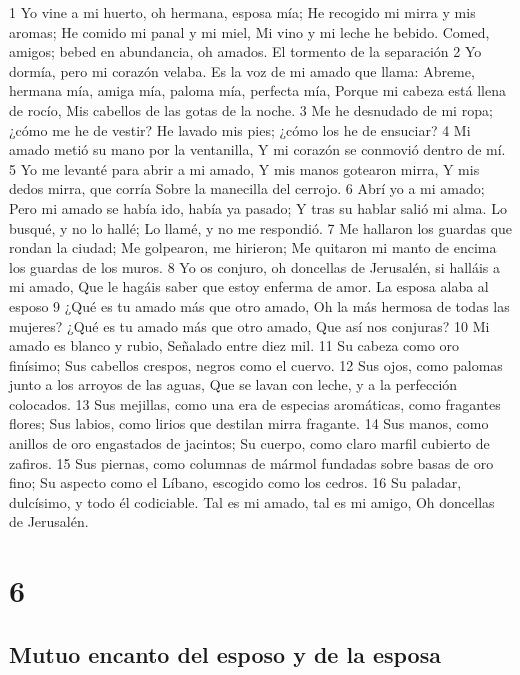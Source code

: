 1 Yo vine a mi huerto, oh hermana, esposa mía;
He recogido mi mirra y mis aromas;
He comido mi panal y mi miel,
Mi vino y mi leche he bebido.
Comed, amigos; bebed en abundancia, oh amados.
El tormento de la separación
2 Yo dormía, pero mi corazón velaba.
Es la voz de mi amado que llama:
Abreme, hermana mía, amiga mía, paloma mía, perfecta mía,
Porque mi cabeza está llena de rocío,
Mis cabellos de las gotas de la noche.
3 Me he desnudado de mi ropa; ¿cómo me he de vestir?
He lavado mis pies; ¿cómo los he de ensuciar?
4 Mi amado metió su mano por la ventanilla,
Y mi corazón se conmovió dentro de mí.
5 Yo me levanté para abrir a mi amado,
Y mis manos gotearon mirra,
Y mis dedos mirra, que corría
Sobre la manecilla del cerrojo.
6 Abrí yo a mi amado;
Pero mi amado se había ido, había ya pasado;
Y tras su hablar salió mi alma.
Lo busqué, y no lo hallé;
Lo llamé, y no me respondió.
7 Me hallaron los guardas que rondan la ciudad;
Me golpearon, me hirieron;
Me quitaron mi manto de encima los guardas de los muros.
8 Yo os conjuro, oh doncellas de Jerusalén, si halláis a mi amado,
Que le hagáis saber que estoy enferma de amor.
La esposa alaba al esposo
9 ¿Qué es tu amado más que otro amado,
Oh la más hermosa de todas las mujeres?
¿Qué es tu amado más que otro amado,
Que así nos conjuras?
10 Mi amado es blanco y rubio,
Señalado entre diez mil.
11 Su cabeza como oro finísimo;
Sus cabellos crespos, negros como el cuervo.
12 Sus ojos, como palomas junto a los arroyos de las aguas,
Que se lavan con leche, y a la perfección colocados.
13 Sus mejillas, como una era de especias aromáticas, como fragantes flores;
Sus labios, como lirios que destilan mirra fragante.
14 Sus manos, como anillos de oro engastados de jacintos;
Su cuerpo, como claro marfil cubierto de zafiros.
15 Sus piernas, como columnas de mármol fundadas sobre basas de oro fino;
Su aspecto como el Líbano, escogido como los cedros.
16 Su paladar, dulcísimo, y todo él codiciable.
Tal es mi amado, tal es mi amigo,
Oh doncellas de Jerusalén.

\chapter{6}

\section*{Mutuo encanto del esposo y de la esposa}

